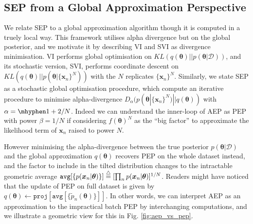 \documentclass{article} %
\begin{document}

%
\subsection{SEP from a Global Approximation Perspective}
We relate SEP to a global approximation algorithm though it is computed in a truely local way. This framework utilises alpha divergence but on the global posterior, and we motivate it by describing VI and SVI as divergence minimisation.
%
VI performs global optimisation on $KL(q(\bm{\theta})||p(\bm{\theta}|\mathcal{D}))$, and its stochastic version, SVI, performs coordinate descent on $KL(q(\bm{\theta}) || p(\bm{\theta} | \{\bm{x}_n\}^N))$ with the $N$ replicates $\{\bm{x}_n\}^N$. Similarly, we state SEP as a stochastic global optimisation procedure, which compute an iterative procedure to minimise alpha-divergence $D_{\alpha}(p(\bm{\theta} | \{\bm{x}_n\}^N) || q(\bm{\theta}))$ with $\alpha = \mhyphen 1 + 2/N$. Indeed we can understand the inner-loop of AEP as PEP with power $\beta = 1/N$ if considering $f(\bm{\theta})^N$ as the ``big factor'' to approximate the likelihood term of $\bm{x}_n$ raised to power $N$.

However minimising the alpha-divergence between the true posterior $p(\bm{\theta}|\mathcal{D})$ and the global approximation $q(\bm{\theta})$ recovers PEP on the whole dataset instead, and the factor to include in the tilted distribution changes to the intractable geometric average $\mathtt{avg}[\{p(\bm{x}_n | \bm{\theta}) \}] \buildrel\triangle\over = [\prod_n p(\bm{x}_n | \bm{\theta}) ]^{1/N} $. Readers might have noticed that the update of PEP on full dataset is given by $q(\bm{\theta}) \leftarrow \mathtt{proj}[\mathtt{avg}[\{ \tilde{p}_n(\bm{\theta}) \}]]$. In other words, we can interpret AEP as an approximation to the impractical batch PEP by interchanging computations, and we illustrate a geometric view for this in Fig. \ref{fig:aep_vs_pep}.
\end{document}
